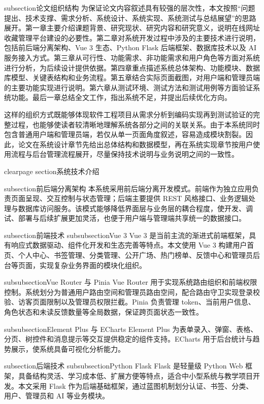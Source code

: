 subsection{论文组织结构}
为保证论文内容叙述具有较强的层次性，本文按照“问题提出、技术支撑、需求分析、系统设计、系统实现、系统测试与总结展望”的思路展开。第一章主要介绍课题背景、研究现状、研究内容和研究意义，说明在线网址收藏管理平台建设的必要性。第二章对系统开发过程中涉及的主要技术进行说明，包括前后端分离架构、Vue 3 生态、Python Flask 后端框架、数据库技术以及 AI 服务接入方式。第三章从可行性、功能需求、非功能需求和用户角色等方面对系统进行分析，为后续设计提供依据。第四章重点描述系统总体架构、功能模块、数据库模型、关键表结构和业务流程。第五章结合实际页面截图，对用户端和管理员端的主要功能实现进行说明。第六章从测试环境、测试方法和测试用例等方面验证系统功能。最后一章总结全文工作，指出系统不足，并提出后续优化方向。

这样的组织方式既能够体现软件工程项目从需求分析到编码实现再到测试验证的完整过程，也能够使读者较清晰地理解系统各部分之间的关联关系。由于本系统同时包含普通用户端和管理员端，若仅从单一页面角度叙述，容易造成模块割裂。因此，论文在系统设计章节先给出总体结构和数据模型，再在系统实现章节按用户使用流程与后台管理流程展开，尽量保持技术说明与业务说明之间的一致性。

clearpage
section{系统技术介绍}

subsection{前后端分离架构}
本系统采用前后端分离开发模式。前端作为独立应用负责页面呈现、交互控制与状态管理；后端主要提供 REST 风格接口、业务逻辑处理与数据库访问服务。该模式能够降低界面层与业务层的耦合程度，使开发、调试、部署与后续扩展更加灵活，也便于用户端与管理端共享统一的数据接口。

subsection{前端技术}
subsubsection{Vue 3}
Vue 3 是当前主流的渐进式前端框架，具有响应式数据驱动、组件化开发和生态完善等特点。本文使用 Vue 3 构建用户首页、个人中心、书签管理、分类管理、公开广场、热门榜单、反馈中心和管理员后台等页面，实现复杂业务界面的模块化组织。

subsubsection{Vue Router 与 Pinia}
Vue Router 用于实现系统路由组织和前端权限控制。系统划分为普通用户路由空间和管理员路由空间，配合路由守卫实现登录校验、访客页面限制以及管理员权限拦截。Pinia 负责管理 token、当前用户信息、角色状态和未读反馈数量等全局数据，保证跨页面状态一致性。

subsubsection{Element Plus 与 ECharts}
Element Plus 为表单录入、弹窗、表格、分页、树控件和消息提示等交互提供稳定的组件支持。ECharts 用于后台统计与趋势展示，使系统具备可视化分析能力。

subsection{后端技术}
subsubsection{Python Flask}
Flask 是轻量级 Python Web 框架，具备结构灵活、学习成本低、扩展方便等特点，适合中小型系统与教学项目开发。本文采用 Flask 作为后端基础框架，通过蓝图机制划分认证、书签、分类、用户、管理员和 AI 等业务模块。

